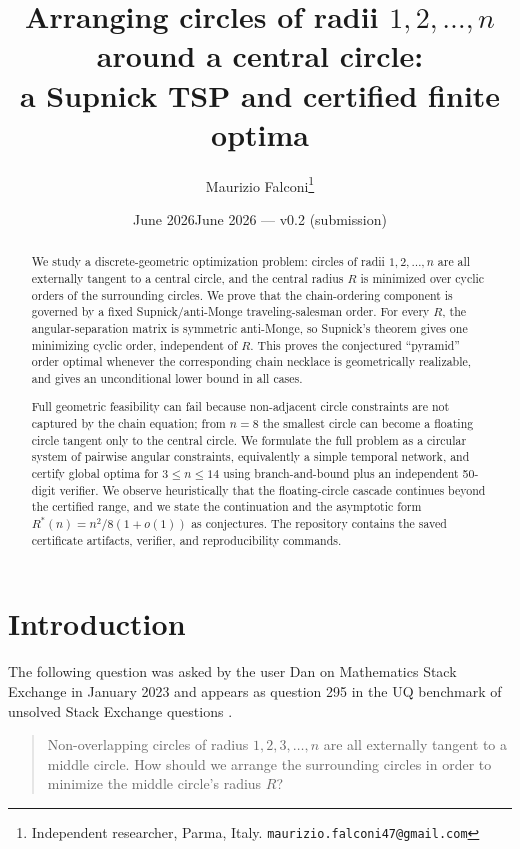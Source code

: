 \documentclass[11pt]{article}
\title{Arranging circles of radii $1,2,\dots,n$ around a central circle:\\
a Supnick TSP and certified finite optima}
\author{Maurizio Falconi\thanks{Independent researcher, Parma, Italy. \texttt{maurizio.falconi47@gmail.com}}}
\date{June 2026}
\date{June 2026 --- v0.2 (submission)}
\theoremstyle{definition}
\theoremstyle{remark}
\begin{document}
\maketitle

\begin{abstract}
We study a discrete-geometric optimization problem: circles of radii $1,2,\dots,n$ are all externally tangent to a central circle, and the central radius $R$ is minimized over cyclic orders of the surrounding circles. We prove that the chain-ordering component is governed by a fixed Supnick/anti-Monge traveling-salesman order. For every $R$, the angular-separation matrix is symmetric anti-Monge, so Supnick's theorem gives one minimizing cyclic order, independent of $R$. This proves the conjectured ``pyramid'' order optimal whenever the corresponding chain necklace is geometrically realizable, and gives an unconditional lower bound in all cases.

Full geometric feasibility can fail because non-adjacent circle constraints are not captured by the chain equation; from $n=8$ the smallest circle can become a floating circle tangent only to the central circle. We formulate the full problem as a circular system of pairwise angular constraints, equivalently a simple temporal network, and certify global optima for $3\le n\le14$ using branch-and-bound plus an independent 50-digit verifier. We observe heuristically that the floating-circle cascade continues beyond the certified range, and we state the continuation and the asymptotic form $R^\ast(n)=n^2/8(1+o(1))$ as conjectures. The repository contains the saved certificate artifacts, verifier, and reproducibility commands.
\end{abstract}

\section{Introduction}

The following question was asked by the user Dan on Mathematics Stack Exchange in January 2023 \cite{mse} and appears as question 295 in the UQ benchmark of unsolved Stack Exchange questions \cite{uq}.

\begin{quote}
Non-overlapping circles of radius $1,2,3,\dots,n$ are all externally tangent to a middle circle. How should we arrange the surrounding circles in order to minimize the middle circle's radius $R$?
\end{quote}
\end{document}
